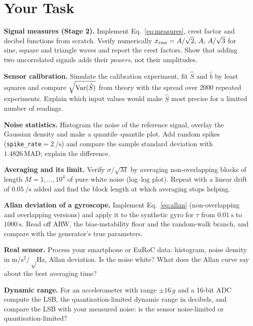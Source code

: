 \documentclass[11pt,a4paper]{article}
\begin{document}
\section*{Your Task}
\begin{tasks}
  \item \textbf{Signal measures (Stage 2).} Implement Eq.~\eqref{eq:measures}, crest factor and decibel functions from scratch. Verify numerically $x_{\rm rms}=A/\sqrt2,\,A,\,A/\sqrt3$ for sine, square and triangle waves and report the crest factors. Show that adding two uncorrelated signals adds their \emph{powers}, not their amplitudes.
  \item \textbf{Sensor calibration.} Simulate the calibration experiment, fit $\hat S$ and $\hat b$ by least squares and compare $\sqrt{\operatorname{Var}(\hat S)}$ from theory with the spread over 2000 repeated experiments. Explain which input values would make $\hat S$ most precise for a limited number of readings.
  \item \textbf{Noise statistics.} Histogram the noise of the reference signal, overlay the Gaussian density and make a quantile--quantile plot. Add random spikes (\texttt{spike\_rate}$=\SI{2}{\per\second}$) and compare the sample standard deviation with $1.4826\,\mathrm{MAD}$; explain the difference.
  \item \textbf{Averaging and its limit.} Verify $\sigma/\sqrt M$ by averaging non-overlapping blocks of length $M=1,\dots,10^4$ of pure white noise (log--log plot). Repeat with a linear drift of $\SI{0.05}{\per\second}$ added and find the block length at which averaging stops helping.
  \item \textbf{Allan deviation of a gyroscope.} Implement Eq.~\eqref{eq:allan} (non-overlapping and overlapping versions) and apply it to the synthetic gyro for $\tau$ from $\SI{0.01}{\second}$ to $\SI{1000}{\second}$. Read off ARW, the bias-instability floor and the random-walk branch, and compare with the generator's true parameters.
  \item \textbf{Real sensor.} Process your smartphone or EuRoC data: histogram, noise density in $\si{\metre\per\second\squared\per\sqrt\hertz}$, Allan deviation. Is the noise white? What does the Allan curve say about the best averaging time?
  \item \textbf{Dynamic range.} For an accelerometer with range $\pm 16\,g$ and a 16-bit ADC compute the LSB, the quantisation-limited dynamic range in decibels, and compare the LSB with your measured noise: is the sensor noise-limited or quantisation-limited?
\end{tasks}
\end{document}
